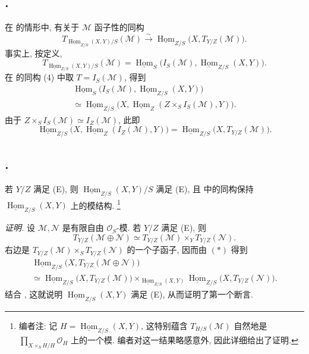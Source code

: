 \subsection*{.}
在 的情形中,
有关于 \(\mathcal M\) 函子性的同构
\[
  T_{\underline{\operatorname{Hom}}_{Z/S}(X,Y)/S}(\mathcal M)
  \xrightarrow{\sim}
  \underline{\operatorname{Hom}}_{Z/S}
    \bigl(X,T_{Y/Z}(\mathcal M)\bigr).
\]
事实上, 按定义,
\[
  T_{\underline{\operatorname{Hom}}_{Z/S}(X,Y)/S}(\mathcal M)
  =\underline{\operatorname{Hom}}_S
    \bigl(I_S(\mathcal M),\underline{\operatorname{Hom}}_{Z/S}(X,Y)\bigr).
\]
在  的同构 (4) 中取
\(T=I_S(\mathcal M)\), 得到
\begin{multline*}
  \underline{\operatorname{Hom}}_S
    \bigl(I_S(\mathcal M),\underline{\operatorname{Hom}}_{Z/S}(X,Y)\bigr)\\
  \simeq
  \underline{\operatorname{Hom}}_{Z/S}
    \bigl(X,\underline{\operatorname{Hom}}_Z
      (Z\times_SI_S(\mathcal M),Y)\bigr).
\end{multline*}
由于 \(Z\times_SI_S(\mathcal M)\simeq I_Z(\mathcal M)\), 此即
\[
  \underline{\operatorname{Hom}}_{Z/S}
    \bigl(X,\underline{\operatorname{Hom}}_Z(I_Z(\mathcal M),Y)\bigr)
  =\underline{\operatorname{Hom}}_{Z/S}
    \bigl(X,T_{Y/Z}(\mathcal M)\bigr).
\]

\subsection*{.}
若 \(Y/Z\) 满足 (E), 则
\(\underline{\operatorname{Hom}}_{Z/S}(X,Y)/S\) 满足 (E),
且  中的同构保持
\(\underline{\operatorname{Hom}}_{Z/S}(X,Y)\) 上的模结构.
\footnote{编者注: 记
\(H=\underline{\operatorname{Hom}}_{Z/S}(X,Y)\),
这特别蕴含 \(T_{H/S}(\mathcal M)\) 自然地是
\(\prod_{X\times_SH/H}\mathcal O_H\) 上的一个模.
编者对这一结果略感意外, 因此详细给出了证明.}

\emph{证明.}
设 \(\mathcal M,\mathcal N\) 是有限自由 \(\mathcal O_S\)-模.
若 \(Y/Z\) 满足 (E), 则
\[
  T_{Y/Z}(\mathcal M\oplus\mathcal N)
  \simeq T_{Y/Z}(\mathcal M)\times_YT_{Y/Z}(\mathcal N).
\]
右边是 \(T_{Y/Z}(\mathcal M)\times_ST_{Y/Z}(\mathcal N)\)
的一个子函子, 因而由  \((*)\) 得到
\begin{multline*}
  \underline{\operatorname{Hom}}_{Z/S}
    \bigl(X,T_{Y/Z}(\mathcal M\oplus\mathcal N)\bigr)\\
  \simeq
  \underline{\operatorname{Hom}}_{Z/S}\bigl(X,T_{Y/Z}(\mathcal M)\bigr)
  \mathop{\times}_{\underline{\operatorname{Hom}}_{Z/S}(X,Y)}
  \underline{\operatorname{Hom}}_{Z/S}\bigl(X,T_{Y/Z}(\mathcal N)\bigr).
\end{multline*}
结合 ,
这就说明 \(\underline{\operatorname{Hom}}_{Z/S}(X,Y)\) 满足 (E),
从而证明了第一个断言.

